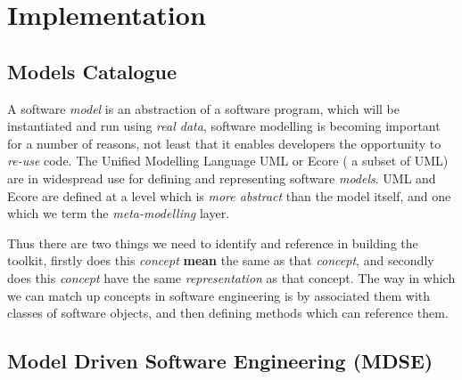\section{Implementation}

\subsection{Models Catalogue}

A software \emph{model} is an abstraction of a software program, which
will be instantiated and run using \emph{real data}, software
modelling is becoming important for a number of reasons, not least
that it enables developers the opportunity to \emph{re-use} code. The
Unified Modelling Language UML \cite{UML} or Ecore \cite{ECORE} ( a
subset of UML) are in widespread use for defining and representing
software \emph{models}. UML and Ecore are defined at a level which is
\emph{more abstract} than the model itself, and one which we term the
\emph{meta-modelling} layer.

Thus there are two things we need to identify and reference in
building the toolkit, firstly does this \emph{concept} \textbf{mean}
the same as that \emph{concept}, and secondly does this \emph{concept}
have the same \emph{representation} as that concept. The way in which
we can match up concepts in software engineering is by associated them
with classes of software objects, and then defining methods which can
reference them.

\subsection{Model Driven Software Engineering (MDSE)}


